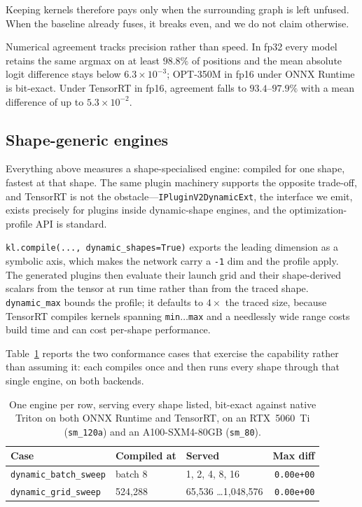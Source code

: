 \documentclass{article}
\begin{document}
Keeping kernels therefore pays only when the surrounding graph is left unfused.
When the baseline already fuses, it breaks even, and we do not claim otherwise.

Numerical agreement tracks precision rather than speed. In fp32 every model
retains the same argmax on at least $98.8\%$ of positions and the mean absolute
logit difference stays below $6.3\times10^{-3}$; OPT-350M in fp16 under ONNX
Runtime is bit-exact. Under TensorRT in fp16, agreement falls to
$93.4$--$97.9\%$ with a mean difference of up to $5.3\times10^{-2}$.

\subsection{Shape-generic engines}
\label{sec:dynamic}

Everything above measures a shape-specialised engine: compiled for one shape,
fastest at that shape. The same plugin machinery supports the opposite
trade-off, and TensorRT is not the obstacle---\texttt{IPluginV2DynamicExt}, the
interface we emit, exists precisely for plugins inside dynamic-shape engines, and
the optimization-profile API is standard.

\texttt{kl.compile(..., dynamic\_shapes=True)} exports the leading dimension as a
symbolic axis, which makes the network carry a \texttt{-1} dim and the profile
apply. The generated plugins then evaluate their launch grid and their
shape-derived scalars from the tensor at run time rather than from the traced
shape. \texttt{dynamic\_max} bounds the profile; it defaults to $4\times$ the
traced size, because TensorRT compiles kernels spanning \texttt{min}$\ldots$\texttt{max}
and a needlessly wide range costs build time and can cost per-shape performance.

Table~\ref{tab:dynamic} reports the two conformance cases that exercise the
capability rather than assuming it: each compiles once and then runs every shape
through that single engine, on both backends.

\begin{table}[t]
\centering
\small
\begin{tabular}{l l l r}
\toprule
\textbf{Case} & \textbf{Compiled at} & \textbf{Served} & \textbf{Max diff} \\ \midrule
\texttt{dynamic\_batch\_sweep} & batch 8 & 1, 2, 4, 8, 16 & \texttt{0.00e+00} \\
\texttt{dynamic\_grid\_sweep} & 524{,}288 & 65{,}536 \ldots 1{,}048{,}576 & \texttt{0.00e+00} \\
\bottomrule
\end{tabular}
\caption{One engine per row, serving every shape listed, bit-exact
against native Triton on both ONNX Runtime and TensorRT, on an RTX~5060~Ti
(\texttt{sm\_120a}) and an A100-SXM4-80GB (\texttt{sm\_80}).}
\label{tab:dynamic}
\end{table}
\end{document}
